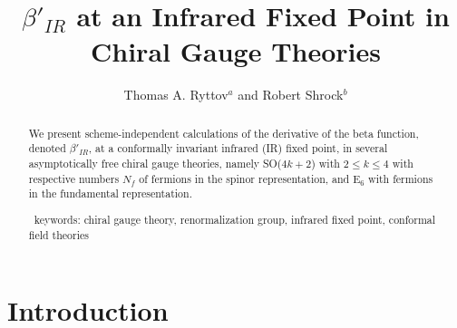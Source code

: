 \documentclass[prd,twocolumn,nofootinbib,amsfonts,amssymb]{revtex4}
\begin{document}
\title{$\beta'_{IR}$ at an Infrared Fixed Point in Chiral Gauge Theories}

\author{Thomas A. Ryttov$^a$ and Robert Shrock$^b$}



\begin{abstract}

  We present scheme-independent calculations of the derivative of the beta
  function, denoted $\beta'_{IR}$, at a conformally invariant infrared (IR)
  fixed point, in several asymptotically free chiral gauge theories, namely
  SO($4k+2$) with $2 \le k \le 4$ with respective numbers $N_f$ of fermions in
  the spinor representation, and E$_6$ with fermions in the fundamental
  representation.

\bigskip

\begin{keywords}
\ keywords: 
chiral gauge theory, renormalization group, infrared fixed point, conformal
field theories
\end{keywords} 

\end{abstract}

\maketitle


\section{Introduction}
\label{intro_section}
\end{document}
